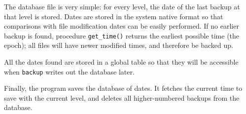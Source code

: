 The database file is very simple: for every level, the date of the last
backup at that level is stored. Dates are stored in the system native
format so that comparisons with file modification dates can be easily
performed. If no earlier backup is found, procedure
\texttt{get\_time()} returns the earliest possible time (the epoch);
all files will have newer modified times, and therefore be backed up.

All the dates found are stored in a global table so that they will be
accessible when \texttt{backup} writes out the database later. 


Finally, the program saves the database of dates. It fetches the current
time to save with the current level, and deletes all
higher-numbered backups from the database.


